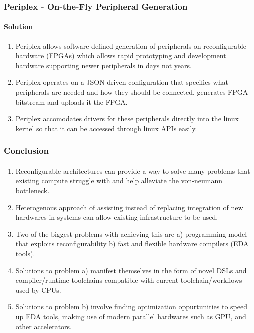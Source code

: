 \documentclass{beamer}
\begin{document}
{\begin{frame}[fragile]
  \frametitle{Periplex - On-the-Fly Peripheral Generation}
  \framesubtitle{Solution}
  \begin{enumerate}
    \item Periplex allows software-defined generation of peripherals on
      reconfigurable hardware (FPGAs) which allows rapid prototyping
      and development hardware supporting newer peripherals in days not years.
    \item Periplex operates on a JSON-driven configuration that specifies 
      what peripherals are needed and how they should be connected, 
      generates FPGA bitstream and uploads it the FPGA.
    \item Periplex accomodates drivers for these peripherals directly into
      the linux kernel so that it can be accessed through linux APIs easily.
  \end{enumerate}
\end{frame}

\begin{frame}[fragile]
  \frametitle{Conclusion}
  \framesubtitle{}

  \begin{enumerate}
    \item Reconfigurable architectures can provide a way to solve many problems
      that existing compute struggle with and help alleviate the von-neumann
      bottleneck.
    \item Heterogenous approach of assisting instead of replacing integration of
      new hardwares in systems can allow existing infrastructure to be used.
    \item Two of the biggest problems with achieving this are a) programming
      model that exploits reconfigurability b) fast and flexible hardware
      compilers (EDA tools).
    \item Solutions to problem a) manifest themselves in the form of novel DSLs
      and compiler/runtime toolchains compatible with current
      toolchain/workflows used by CPUs.
    \item Solutions to problem b) involve finding optimization oppurtunities
      to speed up EDA tools, making use of modern parallel hardwares such as
      GPU, and other accelerators.
  \end{enumerate}
\end{frame}

}
\end{document}
